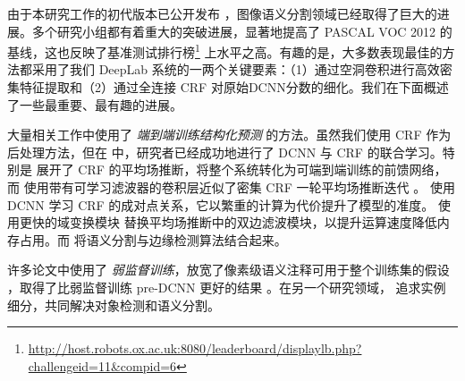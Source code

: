 由于本研究工作的初代版本已公开发布 \cite{chen2014semantic}，图像语义分割领域已经取得了巨大的进展。多个研究小组都有着重大的突破进展，显著地提高了 PASCAL VOC 2012 的基线，这也反映了基准测试排行榜\footnote{\url{http://host.robots.ox.ac.uk:8080/leaderboard/displaylb.php?challengeid=11&compid=6}} \cite{papandreou2015weakly, zheng2015conditional, dai2015boxsup, noh2015learning, liu2015semantic, lin2015efficient, chen2015attention, chen2015semantic}上水平之高。有趣的是，大多数表现最佳的方法都采用了我们 DeepLab 系统的一两个关键要素：（1）通过空洞卷积进行高效密集特征提取和（2）通过全连接 CRF 对原始DCNN分数的细化。我们在下面概述了一些最重要、最有趣的进展。

\newcommand{\mycomment}[1]{}
\mycomment{
	A key difference compared to \cite{long2014fully} lies in the way we produce
	feature maps at the original image resolution: They use a sequence of
	deconvolutional layers \cite{zeiler2014visualizing}, while we use a combination
	of atrous convolution and bilinear interpolation, resulting in a significantly
	simpler system that explicitly handles the signal downsampling issue, requires
	fewer parameters, and is easier to train.
}

大量相关工作中使用了 \textit{端到端训练结构化预测} 的方法。虽然我们使用 CRF 作为后处理方法，但在 \cite{zheng2015conditional, chen2014learning, schwing2015fully, liu2015semantic, lin2015efficient} 中，研究者已经成功地进行了 DCNN 与 CRF 的联合学习。特别是 \cite{zheng2015conditional, schwing2015fully} 展开了 CRF 的平均场推断，将整个系统转化为可端到端训练的前馈网络，而 \cite{liu2015semantic} 使用带有可学习滤波器的卷积层近似了密集 CRF 一轮平均场推断迭代 \cite{krahenbuhl2011efficient}。\cite{lin2015efficient, chandra2016fast} 使用 DCNN 学习 CRF 的成对点关系，它以繁重的计算为代价提升了模型的准度。\cite{chen2015semantic} 使用更快的域变换模块 \cite{GastalOliveira2011DomainTransform} 替换平均场推断中的双边滤波模块，以提升运算速度降低内存占用。而 \cite{bertasius2015high, kokkinos2016pushing} 将语义分割与边缘检测算法结合起来。

许多论文中使用了 \textit{弱监督训练}，放宽了像素级语义注释可用于整个训练集的假设 \cite{pinheiro2014weakly, papandreou2015weakly, pathakICCV15ccnn, hong2015decoupled}，取得了比弱监督训练 pre-DCNN 更好的结果 \cite{vezhnevets2011weakly}。在另一个研究领域，\cite{hariharan2014simultaneous, liang2015proposal} 追求实例细分，共同解决对象检测和语义分割。

